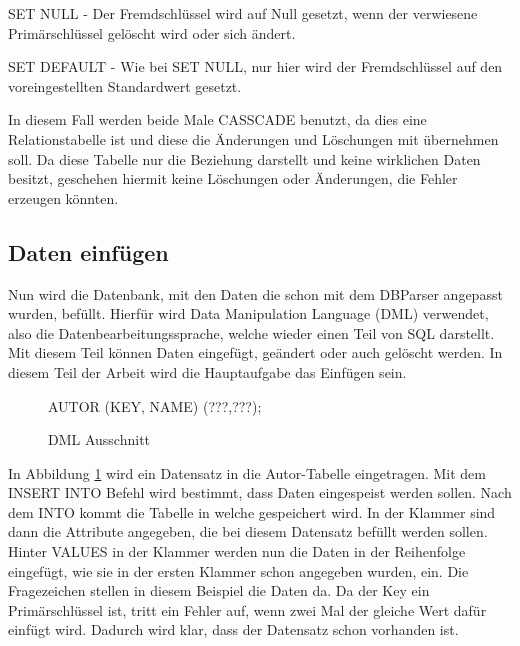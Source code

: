 SET NULL - Der Fremdschlüssel wird auf Null gesetzt, wenn der verwiesene Primärschlüssel gelöscht wird oder sich ändert.

SET DEFAULT - Wie bei SET NULL, nur hier wird der Fremdschlüssel auf den voreingestellten Standardwert gesetzt.

In diesem Fall werden beide Male CASSCADE benutzt, da dies eine Relationstabelle ist und diese die Änderungen und Löschungen mit übernehmen soll. Da diese Tabelle nur die Beziehung darstellt und keine wirklichen Daten besitzt, geschehen hiermit keine Löschungen oder Änderungen, die Fehler erzeugen könnten.


\subsection{Daten einfügen}

Nun wird die Datenbank, mit den Daten die schon mit dem DBParser angepasst wurden, befüllt. Hierfür wird Data Manipulation Language (DML) verwendet, also die Datenbearbeitungssprache, welche wieder einen Teil von SQL darstellt. Mit diesem Teil können Daten eingefügt, geändert oder auch gelöscht werden. In diesem Teil der Arbeit wird die Hauptaufgabe das Einfügen sein.

\begin{figure}[!htb]
	 AUTOR (KEY, NAME)\newline
	 (???,???);\newline
	\caption{DML Ausschnitt}
	\label{fig:dmlbeispiel}
\end{figure}

In Abbildung \ref{fig:dmlbeispiel} wird ein Datensatz in die Autor-Tabelle eingetragen. Mit dem INSERT INTO Befehl wird bestimmt, dass Daten eingespeist werden sollen. Nach dem INTO kommt die Tabelle in welche gespeichert wird. In der Klammer sind dann die Attribute angegeben, die bei diesem Datensatz befüllt werden sollen. Hinter VALUES in der Klammer werden nun die Daten in der Reihenfolge eingefügt, wie sie in der ersten Klammer schon angegeben wurden, ein. Die Fragezeichen stellen in diesem Beispiel die Daten da. Da der Key ein Primärschlüssel ist, tritt ein Fehler auf, wenn zwei Mal der gleiche Wert dafür einfügt wird. Dadurch wird klar, dass der Datensatz schon vorhanden ist.












